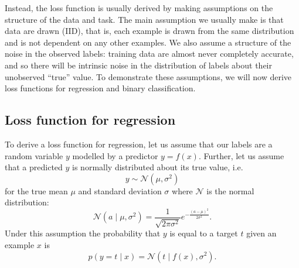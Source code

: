     Instead, the loss function is usually derived by making assumptions on the structure of the data and task. The main assumption we usually make is that data are drawn  (IID), that is, each example is drawn from the same distribution and is not dependent on any other examples. We also assume a structure of the noise in the observed labels: training data are almost never completely accurate, and so there will be intrinsic noise in the distribution of labels about their unobserved ``true'' value. To demonstrate these assumptions, we will now derive loss functions for regression and binary classification.

        \subsection{Loss function for regression}
        \label{sec:loss-regression}

            To derive a loss function for regression, let us assume that our labels are a random variable $y$ modelled by a predictor $y = f(x)$. Further, let us assume that a predicted $y$ is normally distributed about its true value, i.e.
            \begin{equation}
                y \sim \mathcal N(\mu, \sigma^2)
            \end{equation}
            for the true mean $\mu$ and standard deviation $\sigma$ where $\mathcal N$ is the normal distribution:
            \begin{equation}
                \mathcal N(a \mid \mu, \sigma^2) = \frac{1}{\sqrt{2\pi\sigma^2}} e^{-\frac{(a - \mu)^2}{2\sigma^2}}.
            \end{equation}
            Under this assumption the probability that $y$ is equal to a target $t$ given an example $x$ is
            \begin{equation}
                p(y = t \mid x) = \mathcal N(t \mid f(x), \sigma^2).
            \end{equation}

